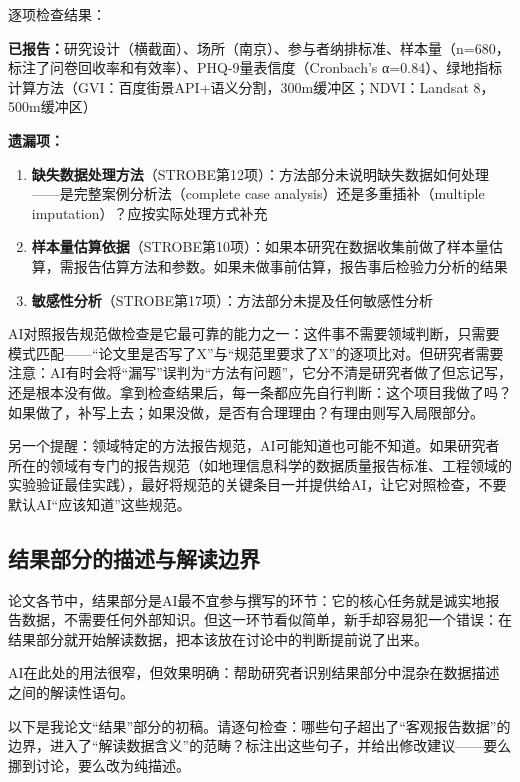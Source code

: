\begin{aibox}
逐项检查结果：

\textbf{已报告：}研究设计（横截面）、场所（南京）、参与者纳排标准、样本量（n=680，标注了问卷回收率和有效率）、PHQ-9量表信度（Cronbach's α=0.84）、绿地指标计算方法（GVI：百度街景API+语义分割，300m缓冲区；NDVI：Landsat 8，500m缓冲区）

\textbf{遗漏项：}
\begin{enumerate}[nosep]
\item \textbf{缺失数据处理方法}（STROBE第12项）：方法部分未说明缺失数据如何处理——是完整案例分析法（complete case analysis）还是多重插补（multiple imputation）？应按实际处理方式补充
\item \textbf{样本量估算依据}（STROBE第10项）：如果本研究在数据收集前做了样本量估算，需报告估算方法和参数。如果未做事前估算，报告事后检验力分析的结果
\item \textbf{敏感性分析}（STROBE第17项）：方法部分未提及任何敏感性分析
\end{enumerate}
\end{aibox}

\begin{critiquebox}
AI对照报告规范做检查是它最可靠的能力之一：这件事不需要领域判断，只需要模式匹配——``论文里是否写了X''与``规范里要求了X''的逐项比对。但研究者需要注意：AI有时会将``漏写''误判为``方法有问题''，它分不清是研究者做了但忘记写，还是根本没有做。拿到检查结果后，每一条都应先自行判断：这个项目我做了吗？如果做了，补写上去；如果没做，是否有合理理由？有理由则写入局限部分。

另一个提醒：领域特定的方法报告规范，AI可能知道也可能不知道。如果研究者所在的领域有专门的报告规范（如地理信息科学的数据质量报告标准、工程领域的实验验证最佳实践），最好将规范的关键条目一并提供给AI，让它对照检查，不要默认AI``应该知道''这些规范。
\end{critiquebox}

\subsection{结果部分的描述与解读边界}

论文各节中，结果部分是AI最不宜参与撰写的环节：它的核心任务就是诚实地报告数据，不需要任何外部知识。但这一环节看似简单，新手却容易犯一个错误：在结果部分就开始解读数据，把本该放在讨论中的判断提前说了出来。

AI在此处的用法很窄，但效果明确：帮助研究者识别结果部分中混杂在数据描述之间的解读性语句。

\begin{userbox}
以下是我论文``结果''部分的初稿。请逐句检查：哪些句子超出了``客观报告数据''的边界，进入了``解读数据含义''的范畴？标注出这些句子，并给出修改建议——要么挪到讨论，要么改为纯描述。
\end{userbox}

